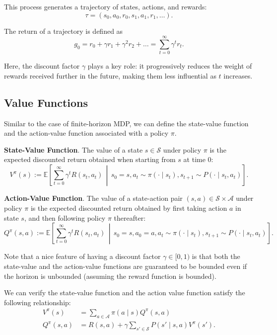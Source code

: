 \documentclass[
]{book}
\theoremstyle{definition}
\theoremstyle{definition}
\theoremstyle{definition}
\theoremstyle{definition}
\theoremstyle{remark}
\begin{document}
This process generates a trajectory of states, actions, and rewards:
\[
\tau = (s_0, a_0, r_0, s_1, a_1, r_1, \dots).
\]

The return of a trajectory is defined as
\[
g_0 = r_0 + \gamma r_1 + \gamma^2 r_2 + \dots = \sum_{t=0}^{\infty} \gamma^t r_t.
\]

Here, the discount factor \(\gamma\) plays a key role: it progressively reduces the weight of rewards received further in the future, making them less influential as \(t\) increases.

\subsection{Value Functions}\label{value-functions}

Similar to the case of finite-horizon MDP, we can define the state-value function and the action-value function associated with a policy \(\pi\).

\textbf{State-Value Function}. The value of a state \(s \in \mathcal{S}\) under policy \(\pi\) is the expected discounted return obtained when starting from \(s\) at time \(0\):
\begin{equation}
V^{\pi}(s) := \mathbb{E}\left[ \sum_{t=0}^{\infty} \gamma^t R(s_t, a_t) \,\middle|\, s_0 = s, a_t \sim \pi(\cdot \mid s_t), s_{t+1} \sim P(\cdot \mid s_t, a_t) \right].
\label{eq:InfiniteHorizonMDPStateValue}
\end{equation}

\textbf{Action-Value Function}. The value of a state-action pair \((s,a) \in \mathcal{S} \times \mathcal{A}\) under policy \(\pi\) is the expected discounted return obtained by first taking action \(a\) in state \(s\), and then following policy \(\pi\) thereafter:
\begin{equation}
Q^{\pi}(s,a) := \mathbb{E} \left[ \sum_{t=0}^{\infty} \gamma^t R(s_t, a_t) \,\middle|\, s_0 = s, a_0 = a, a_t \sim \pi(\cdot \mid s_t), s_{t+1} \sim P(\cdot \mid s_t, a_t) \right].
\label{eq:InfiniteHorizonMDPActionValue}
\end{equation}

Note that a nice feature of having a discount factor \(\gamma \in [0,1)\) is that both the state-value and the action-value functions are guaranteed to be bounded even if the horizon is unbounded (assuming the reward function is bounded).

We can verify the state-value function and the action value function satisfy the following relationship:
\begin{align}
V^{\pi}(s) &= \sum_{a \in \mathcal{A}} \pi(a \mid s) Q^{\pi}(s,a) \label{eq:InfiniteHorizonMDPStateValueActionValueRelation-1}\\
Q^{\pi}(s,a) & = R(s,a) + \gamma \sum_{s' \in \mathcal{S}} P(s' \mid s, a) V^{\pi}(s'). \label{eq:InfiniteHorizonMDPStateValueActionValueRelation-2}
\end{align}
\end{document}
